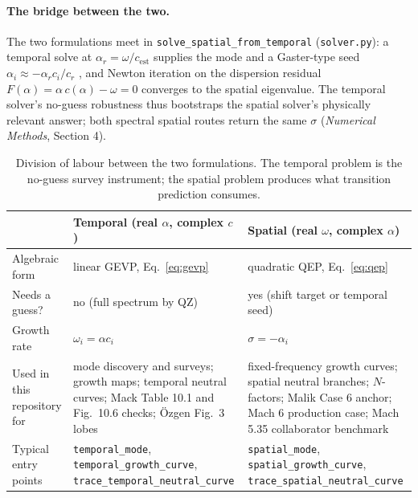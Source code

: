 \documentclass[11pt]{article}
\begin{document}
\paragraph{The bridge between the two.} The two formulations meet in
\texttt{solve\_spatial\_from\_temporal} (\texttt{solver.py}): a temporal solve at
$\alpha_r=\omega/c_{\mathrm{est}}$ supplies the mode and a Gaster-type seed
$\alpha_i\approx-\alpha_rc_i/c_r$ \cite{gaster1962}, and Newton iteration on the dispersion
residual $F(\alpha)=\alpha\,c(\alpha)-\omega=0$ converges to the spatial eigenvalue. The temporal
solver's no-guess robustness thus bootstraps the spatial solver's physically relevant answer;
both spectral spatial routes return the same $\sigma$ (\emph{Numerical Methods}, Section 4).

\begin{table}[H]\centering\small
\renewcommand{\arraystretch}{1.3}
\begin{tabular}{@{}>{\raggedright\arraybackslash}p{4.0cm}>{\raggedright\arraybackslash}p{5.0cm}
>{\raggedright\arraybackslash}p{5.6cm}@{}}
\toprule
 & \textbf{Temporal (real $\alpha$, complex $c$)} & \textbf{Spatial (real $\omega$, complex $\alpha$)} \\
\midrule
Algebraic form & linear GEVP, Eq.~\eqref{eq:gevp} & quadratic QEP, Eq.~\eqref{eq:qep} \\
Needs a guess? & no (full spectrum by QZ) & yes (shift target or temporal seed) \\
Growth rate & $\omega_i=\alpha c_i$ & $\sigma=-\alpha_i$ \\
Used in this repository for & mode discovery and surveys; growth maps; temporal neutral curves;
  Mack Table 10.1 and Fig.~10.6 checks; \"Ozgen Fig.~3 lobes & fixed-frequency growth curves;
  spatial neutral branches; $N$-factors; Malik Case 6 anchor; Mach 6 production case;
  Mach 5.35 collaborator benchmark \\
Typical entry points & \texttt{temporal\_mode}, \texttt{temporal\_growth\_curve},
  \texttt{trace\_temporal\_neutral\_curve} & \texttt{spatial\_mode},
  \texttt{spatial\_growth\_curve}, \texttt{trace\_spatial\_neutral\_curve} \\
\bottomrule
\end{tabular}
\caption{Division of labour between the two formulations. The temporal problem is the
no-guess survey instrument; the spatial problem produces what transition prediction consumes.}
\label{tab:formulations}
\end{table}

\end{document}
